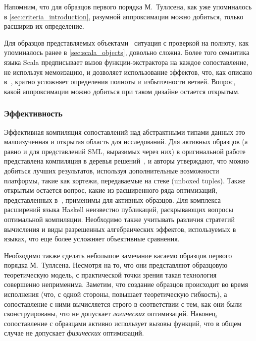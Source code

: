 Напомним, что для образцов первого порядка М.~Туллсена, как уже упоминалось в \ref{sec:criteria_introduction}, разумной аппроксимации можно добиться, только расширив их определение.

Для образцов представляемых объектами~\cite{emir2007objects} ситуация с проверкой на полноту, как упоминалось ранее в \ref{sec:scala_objects}, довольно сложна. Более того семантика языка Scala предписывает вызов функции-экстрактора на каждое сопоставление, не используя мемоизацию, и дозволяет использование эффектов, что, как описано в~\cite{okasaki98views}, кратно усложняет определения полноты и избыточности ветвей. Вопрос, какой аппроксимации можно добиться при таком дизайне остается открытым.

\subsubsection{Эффективность}

Эффективная компиляция сопоставлений над абстрактными типами данных это малоизученная и открытая область для исследований. Для активных образцов (а равно и для представлений SML, выразимых через них) в оригинальной работе~\cite{syme2007extensible} представлена компиляция в деревья решений~\cite{scott2000whendo}, и авторы утверждают, что можно добиться лучших результатов, используя дополнительные возможности платформы, такие как кортежи, передаваемые на стеке (unboxed tuples). Также открытым остается вопрос, какие из расширенного ряда оптимизаций, представленных в~\cite{maranget2008decisiontrees}, применимы для активных образцов. Для комплекса расширений языка Haskell неизвестно публикаций, раскрывающих вопросы оптимальной компиляции. Необходимо также учитывать различия стратегий вычисления и виды разрешенных алгебраических эффектов, используемых в языках, что еще более усложняет объективные сравнения.

Необходимо также сделать небольшое замечание касаемо образцов первого порядка М.~Туллсена. Несмотря на то, что они представляют образцовую теоретическую модель, с практической точки зрения такая технология совершенно неприменима. Заметим, что создание образцов происходит во время исполнения (что, с одной стороны, повышает теоретическую гибкость), а сопоставление с ними вычисляется строго в соответствии с тем, как они были сконструированы, что не допускает \textit{логических} оптимизаций. Наконец, сопоставление с образцами активно использует вызовы функций, что в общем случае не допускает \textit{физических} оптимизаций. 

